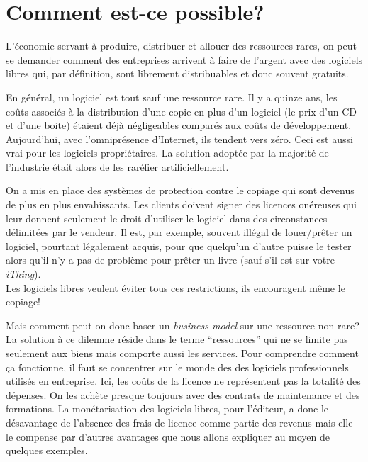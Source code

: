 \documentclass[10pt]{../fiche}
\begin{document}


\section*{Comment est-ce possible?}
L'économie servant à produire, distribuer et allouer des ressources rares,
on peut se demander comment des entreprises arrivent à faire de l'argent avec des logiciels libres qui, par définition, sont librement distribuables et donc souvent gratuits.

En général, un logiciel est tout sauf une ressource rare. Il y a quinze ans, les coûts
associés à la distribution d'une copie en plus d'un logiciel (le prix d'un CD et d'une boite) étaient déjà négligeables
comparés aux coûts de développement. Aujourd’hui, avec l'omniprésence d'Internet, ils tendent vers zéro.
Ceci est aussi vrai pour les logiciels propriétaires. La solution adoptée par
la majorité de l'industrie était alors de les raréfier artificiellement.

On a mis en place des systèmes de protection contre le copiage qui sont devenus
de plus en plus envahissants. Les clients doivent signer des licences onéreuses qui
leur donnent seulement le droit d'utiliser le logiciel dans des circonstances délimitées par le vendeur.
Il est, par exemple, souvent illégal de louer/prêter un logiciel, pourtant légalement acquis,
pour que quelqu'un d'autre puisse le tester alors qu'il n'y a pas de problème pour prêter un livre (sauf s'il est sur votre \textit{iThing}).\\
Les logiciels libres veulent éviter tous ces restrictions, ils encouragent même le copiage!

Mais comment peut-on donc baser un \textit{business model} sur une ressource non rare?
La solution à ce dilemme réside dans le terme ``ressources'' qui
ne se limite pas seulement aux biens mais comporte aussi les services.
Pour comprendre comment ça fonctionne, il faut se concentrer sur le monde des
des logiciels professionnels utilisés en entreprise. Ici, les coûts de la licence
ne représentent pas la totalité des dépenses. On les achète presque toujours avec
des contrats de maintenance et des formations.
La monétarisation des logiciels libres, pour l'éditeur, a donc le désavantage de l'absence des frais de licence
comme partie des revenus mais elle le compense par d'autres avantages que nous allons
expliquer au moyen de quelques exemples.
\end{document}

